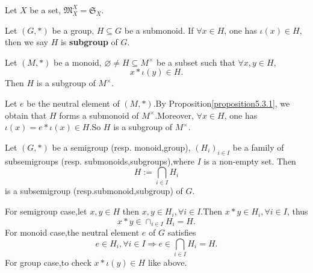 \documentclass{book}
\numberwithin{equation}{section}
\begin{document}
\begin{exampleenv}
    Let $X$ be a set, $\mathfrak{M} _X^X=\mathfrak{S} _X$.
\end{exampleenv}
\begin{definitionenv}
    Let $(G,*)$ be a group, $H\subseteq G$ be a submonoid. If $\forall x\in H$, one has $\iota(x)\in H$, then we say $H$ is \textbf{subgroup} of $G$.
\end{definitionenv}
\begin{propositionenv}
    Let $(M,*)$ be a monoid, $\varnothing \not=H\subseteq M^\times$ be a subset such that $\forall x,y \in H$,
    $$x*\iota(y)\in H.$$
    Then $H$ is a subgroup of $M^\times$.
\end{propositionenv}
\begin{proofenv}
    Let $e$ be the neutral element of $(M,*)$.By Proposition\ref{proposition5.3.1}, we obtain that $H$ forms a submonoid of $M^\times$.Moreover, $\forall x \in H$, one has $\iota(x)=e*\iota(x)\in H$.So $H$ is a subgroup of $M^\times$.
\end{proofenv}
\begin{propositionenv}
    Let $(G,*)$ be a semigroup (resp. monoid,group), $(H_i)_{i\in I}$ be a family of subsemigroups (resp. submonoids,subgroups),where $I$ is a non-empty set. Then 
    $$H:=\bigcap_{i\in I}H_i$$
    is a subsemigroup (resp.submonoid,subgroup) of $G$.
\end{propositionenv}
\begin{proofenv}
    \quad\newline
    For semigroup case,let $x,y\in H$ then $x,y\in H_i,\forall i \in I$.Then $x*y\in H_i,\forall i \in I $, thus 
    $$x*y\in \cap_{i\in I}H_i=H.$$
    For monoid case,the neutral element $e$ of $G$ satisfies
    $$e \in H_i,\forall i \in I\Rightarrow e\in \bigcap_{i\in I}H_i=H.$$
    For group case,to check $x*\iota(y)\in H$ like above.
\end{proofenv}
\end{document}

